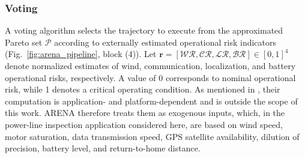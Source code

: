 \documentclass[journal]{IEEEtran}
\begin{document}
\subsubsection{Voting}
\label{sec:voting}
A voting algorithm selects the trajectory to execute from the approximated Pareto set $\mathcal{P}$ according to externally estimated operational risk indicators (Fig.~\ref{fig:arena_pipeline}, block (4)). Let $\mathbf{r} = [\mathcal{WR}, \mathcal{CR}, \mathcal{LR}, \mathcal{BR}] \in [0, 1]^4$ denote normalized estimates of wind, communication, localization, and battery operational risks, respectively. A value of 0 corresponds to nominal operational risk, while 1 denotes a critical operating condition. As mentioned in \cite{petit2024}, their computation is application- and platform-dependent and is outside the scope of this work. ARENA therefore treats them as exogenous inputs, which, in the power-line inspection application considered here, are based on wind speed, motor saturation, data transmission speed, GPS satellite availability, dilution of precision, battery level, and return-to-home distance.
\end{document}

